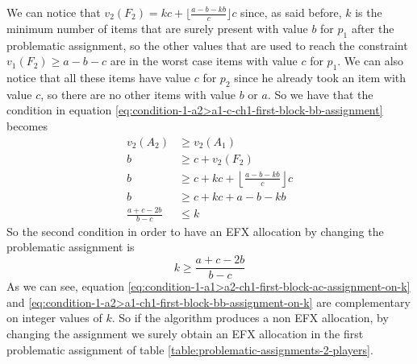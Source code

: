 We can notice that $v_2(F_2) = kc + \lfloor \frac{a-b-kb}{c} \rfloor c$ since, as said before, $k$ is the minimum number of items that are surely present with value $b$ for $p_1$ after the problematic assignment, so the other values that are used to reach the constraint $v_1(F_2) \ge a-b-c$ are in the worst case items with value $c$ for $p_1$. We can also notice that all these items have value $c$ for $p_2$ since he already took an item with value $c$, so there are no other items with value $b$ or $a$. So we have that the condition in equation \ref{eq:condition-1-a2>a1-c-ch1-first-block-bb-assignment} becomes
\begin{align*}
    v_2(A_2) &\ge v_2(A_1)\\
     b  &\ge  c + v_2(F_2)\\
      b  &\ge  c +  kc + \left\lfloor \frac{a-b-kb}{c} \right\rfloor c\\
      b  &\ge  c +  kc + a-b-kb\\
      \frac{a + c -2b}{b-c}  &\le   k
\end{align*}
So the second condition in order to have an EFX allocation by changing the problematic assignment is 
\begin{equation}
    k \ge \frac{a + c -2b}{b-c}
    \label{eq:condition-1-a2>a1-ch1-first-block-bb-assignment-on-k}
\end{equation}
As we can see, equation \ref{eq:condition-1-a1>a2-ch1-first-block-ac-assignment-on-k} and \ref{eq:condition-1-a2>a1-ch1-first-block-bb-assignment-on-k} are complementary on integer values of $k$. So if the algorithm produces a non EFX allocation, by changing the assignment we surely obtain an EFX allocation in the first problematic assignment of table \ref{table:problematic-assignments-2-players}. 

